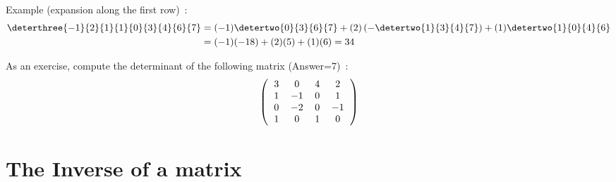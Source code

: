 Example (expansion along the first row)~:
\begin{align}
\deterthree{-1}{2}{1}{1}{0}{3}{4}{6}{7}&=(-1)\detertwo{0}{3}{6}{7}+(2)\left(-\detertwo{1}{3}{4}{7}\right)+(1)\detertwo{1}{0}{4}{6}\nonumber\\
&=(-1)(-18)+(2)(5)+(1)(6)=34\nonumber
\end{align}

As an exercise, compute the determinant of the following matrix (Answer=7)~:
\[
\left(\begin{tabular}{cccc}\centering
$3$  & $0$  &  $4$ & $2$\\
$1$  & $-1$  &  $0$ & $1$\\
$0$  & $-2$  &  $0$ & $-1$\\
$1$  & $0$  &  $1$ & $0$\end{tabular}\right)
\]


\section{The Inverse of a matrix}

